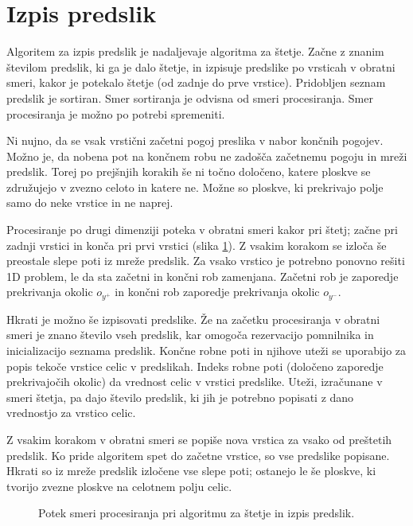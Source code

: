 \documentclass[12pt,a4paper,openany,twoside]{book}
\begin{document}
\section{Izpis predslik}

Algoritem za izpis predslik je nadaljevaje algoritma za štetje.
Začne z znanim številom predslik, ki ga je dalo štetje, in izpisuje predslike
po vrsticah v obratni smeri, kakor je potekalo štetje (od zadnje do prve vrstice).
Pridobljen seznam predslik je sortiran. Smer sortiranja je odvisna od smeri procesiranja.
Smer procesiranja je možno po potrebi spremeniti.

Ni nujno, da se vsak vrstični začetni pogoj preslika v nabor končnih pogojev.
Možno je, da nobena pot na končnem robu ne zadošča začetnemu pogoju in mreži predslik.
Torej po prejšnjih korakih še ni točno določeno, katere ploskve se združujejo v zvezno
celoto in katere ne. Možne so ploskve, ki prekrivajo polje samo do neke vrstice in ne naprej.

Procesiranje po drugi dimenziji poteka v obratni smeri kakor pri štetj;
začne pri zadnji vrstici in konča pri prvi vrstici (slika \ref{algorithm_list}).
Z vsakim korakom se izloča še preostale slepe poti iz mreže predslik.
Za vsako vrstico je potrebno ponovno rešiti 1D problem,
le da sta začetni in končni rob zamenjana.
Začetni rob je zaporedje prekrivanja okolic \(o_{y^+}\)
in končni rob zaporedje prekrivanja okolic \(o_{y^-}\).

Hkrati je možno še izpisovati predslike. Že na začetku procesiranja v obratni smeri
je znano število vseh predslik, kar omogoča rezervacijo pomnilnika in inicializacijo seznama predslik.
Končne robne poti in njihove uteži se uporabijo za popis tekoče vrstice celic v predslikah.
Indeks robne poti (določeno zaporedje prekrivajočih okolic) da vrednost celic v vrstici predslike.
Uteži, izračunane v smeri štetja, pa dajo število predslik,
ki jih je potrebno popisati z dano vrednostjo za vrstico celic.

Z vsakim korakom v obratni smeri se popiše nova vrstica za vsako od preštetih predslik.
Ko pride algoritem spet do začetne vrstice, so vse predslike popisane.
Hkrati so iz mreže predslik izločene vse slepe poti; ostanejo le še ploskve,
ki tvorijo zvezne ploskve na celotnem polju celic.

\begin{figure}[htb]
\centerline{}
\caption[Algoritem za izpis predslik.]{Potek smeri procesiranja pri algoritmu za štetje in izpis predslik.}
\label{algorithm_list}
\end{figure}
\end{document}
